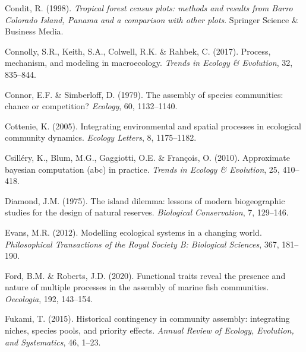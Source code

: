 \begin{thebibliography}{70}
	Condit, R. (1998).
	\newblock \emph{Tropical forest census plots: methods and results from Barro
		Colorado Island, Panama and a comparison with other plots}.
	\newblock Springer Science \& Business Media.
	
	Connolly, S.R., Keith, S.A., Colwell, R.K. \& Rahbek, C. (2017).
	\newblock Process, mechanism, and modeling in macroecology.
	\newblock \emph{Trends in Ecology \& Evolution}, 32, 835--844.
	
	Connor, E.F. \& Simberloff, D. (1979).
	\newblock The assembly of species communities: chance or competition?
	\newblock \emph{Ecology}, 60, 1132--1140.
	
	Cottenie, K. (2005).
	\newblock Integrating environmental and spatial processes in ecological
	community dynamics.
	\newblock \emph{Ecology Letters}, 8, 1175--1182.
	
	Csill{\'e}ry, K., Blum, M.G., Gaggiotti, O.E. \& Fran{\c{c}}ois, O. (2010).
	\newblock Approximate bayesian computation (abc) in practice.
	\newblock \emph{Trends in Ecology \& Evolution}, 25, 410--418.
	
	Diamond, J.M. (1975).
	\newblock The island dilemma: lessons of modern biogeographic studies for the
	design of natural reserves.
	\newblock \emph{Biological Conservation}, 7, 129--146.
	
	Evans, M.R. (2012).
	\newblock Modelling ecological systems in a changing world.
	\newblock \emph{Philosophical Transactions of the Royal Society B: Biological
		Sciences}, 367, 181--190.
	
	Ford, B.M. \& Roberts, J.D. (2020).
	\newblock Functional traits reveal the presence and nature of multiple
	processes in the assembly of marine fish communities.
	\newblock \emph{Oecologia}, 192, 143--154.
	
	Fukami, T. (2015).
	\newblock Historical contingency in community assembly: integrating niches,
	species pools, and priority effects.
	\newblock \emph{Annual Review of Ecology, Evolution, and Systematics}, 46,
	1--23.
	

\end{thebibliography}
